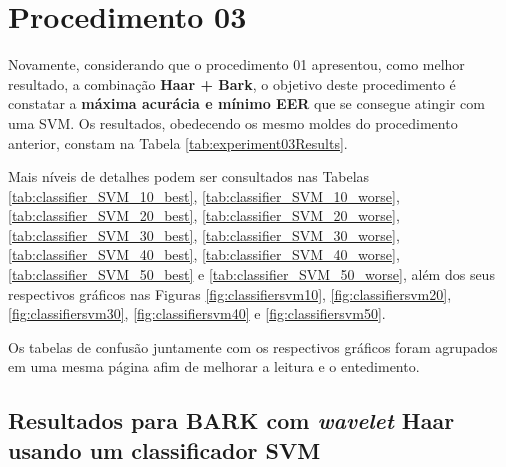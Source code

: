	\section{Procedimento 03}
		\label{chap:testsResults:sec:Experimento03}
		\par Novamente, considerando que o procedimento 01 apresentou, como melhor resultado, a combinação \textbf{Haar + Bark}, o objetivo deste procedimento é constatar a \textbf{máxima acurácia e mínimo EER} que se consegue atingir com uma SVM. Os resultados, obedecendo os mesmo moldes do procedimento anterior, constam na Tabela \ref{tab:experiment03Results}.
		
		\par Mais níveis de detalhes podem ser consultados nas Tabelas \ref{tab:classifier_SVM_10_best}, \ref{tab:classifier_SVM_10_worse}, \ref{tab:classifier_SVM_20_best}, \ref{tab:classifier_SVM_20_worse}, \ref{tab:classifier_SVM_30_best}, \ref{tab:classifier_SVM_30_worse}, \ref{tab:classifier_SVM_40_best}, \ref{tab:classifier_SVM_40_worse}, \ref{tab:classifier_SVM_50_best} e \ref{tab:classifier_SVM_50_worse}, além dos seus respectivos gráficos nas Figuras \ref{fig:classifiersvm10}, \ref{fig:classifiersvm20}, \ref{fig:classifiersvm30}, \ref{fig:classifiersvm40} e \ref{fig:classifiersvm50}.

		
		
		\par Os tabelas de confusão juntamente com os respectivos gráficos foram agrupados em uma mesma página afim de melhorar a leitura e o entedimento.

		\subsection{Resultados para BARK com \textit{wavelet} Haar usando um classificador SVM}
			
			
			
			
			

